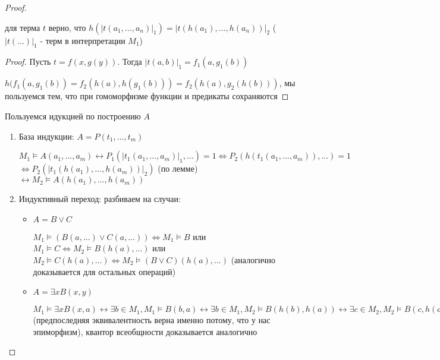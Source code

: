 \documentclass{article}
\begin{document}
\begin{proof}
    \begin{lemma}
        для терма \(t\) верно, что \(h(|t(a_1,..., a_n)|_1) = |t(h(a_1),..., h(a_n))|_2\) (\(|t(...)|_1\) - терм в интерпретации \(M_1\))
    \end{lemma}

    \begin{proof}
        Пусть \(t = f(x, g(y))\). Тогда \(|t(a,b)|_1 = f_1(a, g_1(b))\)

        \(h(f_1(a, g_1(b)) = f_2(h(a), h(g_1(b))) = f_2(h(a), g_2(h(b)))\), мы пользуемся тем, что при гомоморфизме функции и предикаты сохраняются
    \end{proof}

    Пользуемся идукцией по построению \(A\)
    \begin{enumerate}
        \item База индукции: \(A = P(t_1,..., t_m)\)

        \(M_1 \vDash A(a_1,...,a_m) \leftrightarrow P_1(|t_1(a_1,..., a_m)|_1,...) = 1 \Leftrightarrow P_2(h(t_1(a_1,..., a_m)),...) = 1\)\\
        \(\Leftrightarrow P_2(|t_1(h(a_1),..., h(a_m))|_2)\) (по лемме) \(\leftrightarrow M_2 \vDash A(h(a_1),..., h(a_m))\)

        \item Индуктивный переход: разбиваем на случаи:
        \begin{itemize}
            \item \(A = B \vee C\)

            \(M_1 \vDash (B(a,...) \vee C(a,...)) \Leftrightarrow M_1 \vDash B\) или \(M_1 \vDash C \Leftrightarrow M_2 \vDash B(h(a),...)\) или \(M_2 \vDash C(h(a),...) \Leftrightarrow M_2 \vDash (B \vee C)(h(a),...)\) (аналогично доказывается для остальных операций)
            \item \(A = \exists x B(x, y)\)

            \(M_1 \vDash \exists x B(x, a) \leftrightarrow \exists b \in M_1, M_1 \vDash B(b, a) \leftrightarrow \exists b \in M_1, M_2 \vDash B(h(b), h(a)) \leftrightarrow \exists c \in M_2, M_2 \vDash B(c, h(a)) \leftrightarrow M_2 \vDash \exists x B(x, h(a))\) (предпоследняя эквивалентность верна именно потому, что у нас эпиморфизм), квантор всеобщности доказывается аналогично
        \end{itemize}
    \end{enumerate}
\end{proof}
\end{document}
